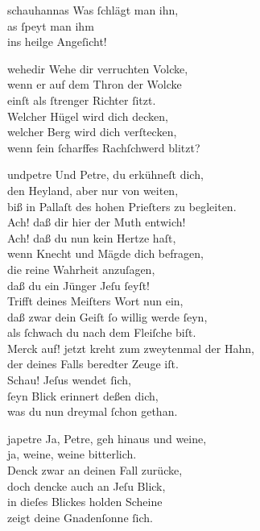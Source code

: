 \documentclass[abbrwidth=6em,tocstyle=ref-genre,shorttitlesize=50]{ees}
\begin{document}
{\begin{movement}{schauhannas}
  \voice[both]
  Was ſchlägt man ihn,\\
  as ſpeyt man ihm\\
  ins heilge Angeſicht!
\end{movement}

\begin{movement}{wehedir}
  Wehe dir verruchten Volcke,\\
  wenn er auf dem Thron der Wolcke\\
  einſt als ſtrenger Richter ſitzt.\\
  Welcher Hügel wird dich decken,\\
  welcher Berg wird dich verſtecken,\\
  wenn ſein ſcharffes Rachſchwerd blitzt?
\end{movement}

\begin{movement}{undpetre}
  \voice[Alto]
  Und Petre, du erkühneſt dich,\\
  den Heyland, aber nur von weiten,\\
  biß in Pallaſt des hohen Prieſters zu begleiten.\\
  Ach! daß dir hier der Muth entwich!\\
  Ach! daß du nun kein Hertze haſt,\\
  wenn Knecht und Mägde dich befragen,\\
  die reine Wahrheit anzuſagen,\\
  daß du ein Jünger Jeſu ſeyſt!\\
  Trifft deines Meiſters Wort nun ein,\\
  daß zwar dein Geiſt ſo willig werde ſeyn,\\
  als ſchwach du nach dem Fleiſche biſt.\\
  Merck auf! jetzt kreht zum zweytenmal der Hahn,\\
  der deines Falls beredter Zeuge iſt.\\
  Schau! Jeſus wendet ſich,\\
  ſeyn Blick erinnert deßen dich,\\
  was du nun dreymal ſchon gethan.
\end{movement}

\begin{movement}{japetre}
  \voice[Alto]
  Ja, Petre, geh hinaus und weine,\\
  ja, weine, weine bitterlich.\\
  Denck zwar an deinen Fall zurücke,\\
  doch dencke auch an Jeſu Blick,\\
  in dieſes Blickes holden Scheine\\
  zeigt deine Gnadenſonne ſich.
\end{movement}

}
\end{document}
